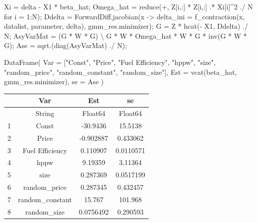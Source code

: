 \documentclass[
  letterpaper,
  DIV=11,
  numbers=noendperiod]{scrreprt}
\newenvironment{Shaded}{\begin{snugshade}}{\end{snugshade}}
\newcommand{\CharTok}[1]{\textcolor[rgb]{0.13,0.47,0.30}{#1}}
\newcommand{\FunctionTok}[1]{\textcolor[rgb]{0.28,0.35,0.67}{#1}}
\newcommand{\NormalTok}[1]{\textcolor[rgb]{0.00,0.23,0.31}{#1}}
\newcommand{\OperatorTok}[1]{\textcolor[rgb]{0.37,0.37,0.37}{#1}}
\newcommand{\StringTok}[1]{\textcolor[rgb]{0.13,0.47,0.30}{#1}}
\begin{document}
\begin{Shaded}
\begin{Highlighting}[]
\NormalTok{Xi }\OperatorTok{=}\NormalTok{ delta }\OperatorTok{{-}}\NormalTok{ X1 }\OperatorTok{*}\NormalTok{ beta\_hat;}
\NormalTok{Omega\_hat }\OperatorTok{=} \FunctionTok{reduce}\NormalTok{(}\OperatorTok{+}\NormalTok{, Z[i,}\OperatorTok{:}\NormalTok{] }\OperatorTok{*}\NormalTok{ Z[i,}\OperatorTok{:}\NormalTok{]}\CharTok{\textquotesingle{} .* Xi[i]\^{}2 ./ N for i = 1:N);}
\NormalTok{Ddelta }\OperatorTok{=}\NormalTok{ ForwardDiff.}\FunctionTok{jacobian}\NormalTok{(x }\OperatorTok{{-}\textgreater{}}\NormalTok{ delta\_ini }\OperatorTok{=} \FunctionTok{f\_contraction}\NormalTok{(x, datalist, parameter, delta), gmm\_res.minimizer);}
\NormalTok{G }\OperatorTok{=}\NormalTok{ Z}\OperatorTok{\textquotesingle{}} \OperatorTok{*} \FunctionTok{hcat}\NormalTok{(}\OperatorTok{{-}}\NormalTok{ X1, Ddelta) }\OperatorTok{./}\NormalTok{ N;}
\NormalTok{AsyVarMat }\OperatorTok{=}\NormalTok{ (G}\OperatorTok{\textquotesingle{}} \OperatorTok{*}\NormalTok{ W }\OperatorTok{*}\NormalTok{ G) }\OperatorTok{\textbackslash{}}\NormalTok{ G}\OperatorTok{\textquotesingle{}} \OperatorTok{*}\NormalTok{ W }\OperatorTok{*}\NormalTok{ Omega\_hat }\OperatorTok{*}\NormalTok{ W }\OperatorTok{*}\NormalTok{ G }\OperatorTok{*} \FunctionTok{inv}\NormalTok{(G}\OperatorTok{\textquotesingle{}} \OperatorTok{*}\NormalTok{ W }\OperatorTok{*}\NormalTok{ G);}
\NormalTok{Ase }\OperatorTok{=} \FunctionTok{sqrt}\NormalTok{.(}\FunctionTok{diag}\NormalTok{(AsyVarMat) }\OperatorTok{./}\NormalTok{ N);}

\FunctionTok{DataFrame}\NormalTok{(}
\NormalTok{    Var }\OperatorTok{=}\NormalTok{ [}\StringTok{"Const"}\NormalTok{, }\StringTok{"Price"}\NormalTok{, }\StringTok{"Fuel Efficiency"}\NormalTok{, }\StringTok{"hppw"}\NormalTok{, }\StringTok{"size"}\NormalTok{, }\StringTok{"random\_price"}\NormalTok{, }\StringTok{"random\_constant"}\NormalTok{, }\StringTok{"random\_size"}\NormalTok{],}
\NormalTok{    Est }\OperatorTok{=} \FunctionTok{vcat}\NormalTok{(beta\_hat, gmm\_res.minimizer),}
\NormalTok{    se }\OperatorTok{=}\NormalTok{ Ase}
\NormalTok{)}
\end{Highlighting}
\end{Shaded}

\begin{tabular}{r|ccc}
    & Var & Est & se\\
    \hline
    & String & Float64 & Float64\\
    \hline
    1 & Const & -30.9436 & 15.5138 \\
    2 & Price & -0.902887 & 0.433062 \\
    3 & Fuel Efficiency & 0.110907 & 0.0110571 \\
    4 & hppw & 9.19359 & 3.11364 \\
    5 & size & 0.287369 & 0.0517199 \\
    6 & random\_price & 0.287345 & 0.432457 \\
    7 & random\_constant & 15.767 & 101.968 \\
    8 & random\_size & 0.0756492 & 0.290593 \\
\end{tabular}
\end{document}
